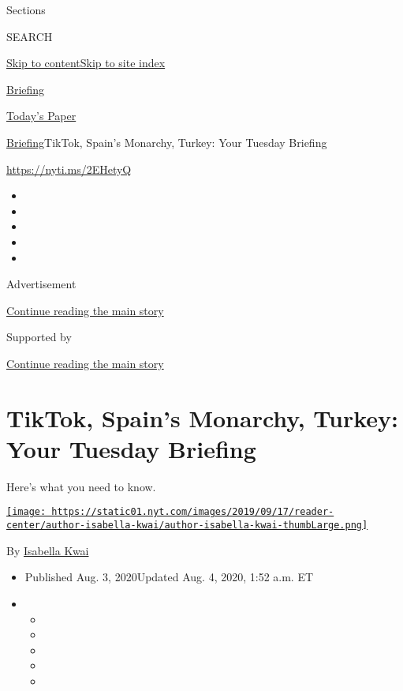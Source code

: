 Sections

SEARCH

\protect\hyperlink{site-content}{Skip to
content}\protect\hyperlink{site-index}{Skip to site index}

\href{https://www.nytimes.com/interactive/2018/briefing/global-morning-briefing-newsletter-signup.html}{Briefing}

\href{https://myaccount.nytimes.com/auth/login?response_type=cookie\&client_id=vi}{}

\href{https://www.nytimes.com/section/todayspaper}{Today's Paper}

\href{/interactive/2018/briefing/global-morning-briefing-newsletter-signup.html}{Briefing}\textbar{}TikTok,
Spain's Monarchy, Turkey: Your Tuesday Briefing

\url{https://nyti.ms/2EHetyQ}

\begin{itemize}
\item
\item
\item
\item
\item
\end{itemize}

Advertisement

\protect\hyperlink{after-top}{Continue reading the main story}

Supported by

\protect\hyperlink{after-sponsor}{Continue reading the main story}

\hypertarget{tiktok-spains-monarchy-turkey-your-tuesday-briefing}{%
\section{TikTok, Spain's Monarchy, Turkey: Your Tuesday
Briefing}\label{tiktok-spains-monarchy-turkey-your-tuesday-briefing}}

Here's what you need to know.

\href{https://www.nytimes.com/by/isabella-kwai}{\texttt{[image: https://static01.nyt.com/images/2019/09/17/reader-center/author-isabella-kwai/author-isabella-kwai-thumbLarge.png]}}

By \href{https://www.nytimes.com/by/isabella-kwai}{Isabella Kwai}

\begin{itemize}
\item
  Published Aug. 3, 2020Updated Aug. 4, 2020, 1:52 a.m. ET
\item
  \begin{itemize}
  \item
  \item
  \item
  \item
  \item
  \end{itemize}
\end{itemize}

